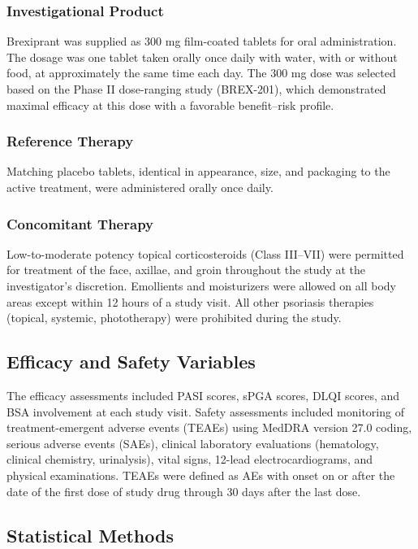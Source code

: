 \subsubsection{Investigational Product}

Brexiprant was supplied as 300 mg film-coated tablets for oral administration. The dosage was one tablet taken orally once daily with water, with or without food, at approximately the same time each day. The 300 mg dose was selected based on the Phase II dose-ranging study (BREX-201), which demonstrated maximal efficacy at this dose with a favorable benefit--risk profile.

\subsubsection{Reference Therapy}

Matching placebo tablets, identical in appearance, size, and packaging to the active treatment, were administered orally once daily.

\subsubsection{Concomitant Therapy}

Low-to-moderate potency topical corticosteroids (Class III--VII) were permitted for treatment of the face, axillae, and groin throughout the study at the investigator's discretion. Emollients and moisturizers were allowed on all body areas except within 12 hours of a study visit. All other psoriasis therapies (topical, systemic, phototherapy) were prohibited during the study.

\subsection{Efficacy and Safety Variables}

The efficacy assessments included PASI scores, sPGA scores, DLQI scores, and BSA involvement at each study visit. Safety assessments included monitoring of treatment-emergent adverse events (TEAEs) using MedDRA version 27.0 coding, serious adverse events (SAEs), clinical laboratory evaluations (hematology, clinical chemistry, urinalysis), vital signs, 12-lead electrocardiograms, and physical examinations. TEAEs were defined as AEs with onset on or after the date of the first dose of study drug through 30 days after the last dose.

\subsection{Statistical Methods}

